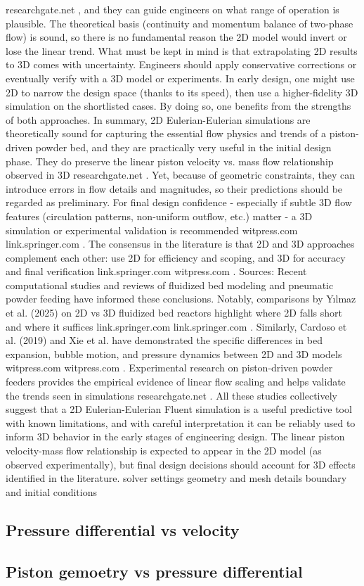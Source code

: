 researchgate.net
, and they can guide engineers on what range of operation is plausible. The theoretical basis (continuity and momentum balance of two-phase flow) is sound, so there is no fundamental reason the 2D model would invert or lose the linear trend. What must be kept in mind is that extrapolating 2D results to 3D comes with uncertainty. Engineers should apply conservative corrections or eventually verify with a 3D model or experiments. In early design, one might use 2D to narrow the design space (thanks to its speed), then use a higher-fidelity 3D simulation on the shortlisted cases. By doing so, one benefits from the strengths of both approaches. In summary, 2D Eulerian-Eulerian simulations are theoretically sound for capturing the essential flow physics and trends of a piston-driven powder bed, and they are practically very useful in the initial design phase. They do preserve the linear piston velocity vs. mass flow relationship observed in 3D
researchgate.net
. Yet, because of geometric constraints, they can introduce errors in flow details and magnitudes, so their predictions should be regarded as preliminary. For final design confidence - especially if subtle 3D flow features (circulation patterns, non-uniform outflow, etc.) matter - a 3D simulation or experimental validation is recommended
witpress.com
link.springer.com
. The consensus in the literature is that 2D and 3D approaches complement each other: use 2D for efficiency and scoping, and 3D for accuracy and final verification
link.springer.com
witpress.com
. Sources: Recent computational studies and reviews of fluidized bed modeling and pneumatic powder feeding have informed these conclusions. Notably, comparisons by Yılmaz et al. (2025) on 2D vs 3D fluidized bed reactors highlight where 2D falls short and where it suffices
link.springer.com
link.springer.com
. Similarly, Cardoso et al. (2019) and Xie et al. have demonstrated the specific differences in bed expansion, bubble motion, and pressure dynamics between 2D and 3D models
witpress.com
witpress.com
. Experimental research on piston-driven powder feeders provides the empirical evidence of linear flow scaling and helps validate the trends seen in simulations
researchgate.net
. All these studies collectively suggest that a 2D Eulerian-Eulerian Fluent simulation is a useful predictive tool with known limitations, and with careful interpretation it can be reliably used to inform 3D behavior in the early stages of engineering design. The linear piston velocity-mass flow relationship is expected to appear in the 2D model (as observed experimentally), but final design decisions should account for 3D effects identified in the literature.
solver settings
geometry and mesh details
boundary and initial conditions

\newpage
\subsection{Pressure differential vs velocity}

\subsection{Piston gemoetry vs pressure differential}
